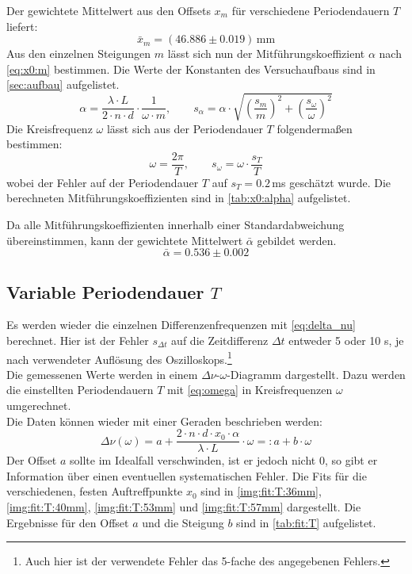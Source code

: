 Der gewichtete Mittelwert aus den Offsets $x_m$ für verschiedene Periodendauern $T$ liefert:
\begin{equation}
  \label{eq:xm}
  \bar{x}_{m} = (46.886 \pm 0.019)\,\text{mm}
\end{equation}
Aus den einzelnen Steigungen $m$ lässt sich nun der Mitführungskoeffizient $\alpha$ nach \autoref{eq:x0:m} bestimmen. Die Werte der Konstanten des 
Versuchaufbaus sind in \autoref{sec:aufbau} aufgelistet.
\begin{equation}
  \alpha = \frac{\lambda \cdot L}{2 \cdot n \cdot d} \cdot \frac{1}{\omega \cdot m}, \qquad
  s_{\alpha} = \alpha \cdot \sqrt{\left(\frac{s_m}{m}\right)^2 + \left(\frac{s_\omega}{\omega}\right)^2}
\end{equation}
Die Kreisfrequenz $\omega$ lässt sich aus der Periodendauer $T$ folgendermaßen bestimmen:
\begin{equation}
  \label{eq:omega}
  \omega = \frac{2 \pi}{T}, \qquad s_{\omega} = \omega \cdot \frac{s_T}{T}
\end{equation}
wobei der Fehler auf der Periodendauer $T$ auf $s_T = 0.2$\,ms geschätzt wurde.
Die berechneten Mitführungskoeffizienten sind in \autoref{tab:x0:alpha} aufgelistet.

Da alle Mitführungskoeffizienten innerhalb einer Standardabweichung übereinstimmen, kann der gewichtete Mittelwert $\bar{\alpha}$ gebildet werden.
\begin{equation}
  \label{eq:x0:alpha:avg}
  \bar{\alpha} = 0.536 \pm 0.002
\end{equation}

\subsection{Variable Periodendauer \texorpdfstring{$T$}{T}}
Es werden wieder die einzelnen Differenzenfrequenzen mit \autoref{eq:delta_nu} berechnet. Hier ist der Fehler $s_{\Delta t}$ 
auf die Zeitdifferenz $\Delta t$ entweder 5 oder 10 \textmu s, je nach verwendeter Auflösung des Oszilloskops.\footnote{Auch hier ist der 
verwendete Fehler das 5-fache des angegebenen Fehlers.} \\
Die gemessenen Werte werden in einem $\Delta \nu$-$\omega$-Diagramm dargestellt. 
Dazu werden die einstellten Periodendauern $T$ mit \autoref{eq:omega} in Kreisfrequenzen $\omega$ umgerechnet. \\
Die Daten können wieder mit einer Geraden beschrieben werden:
\begin{equation}
  \label{eq:nu_omega}
  \Delta \nu (\omega) = a + \frac{2 \cdot n \cdot d \cdot x_0 \cdot \alpha}{\lambda \cdot L} \cdot \omega  =: a + b \cdot \omega
\end{equation}
Der Offset $a$ sollte im Idealfall verschwinden, ist er jedoch nicht 0, so gibt er Information über einen eventuellen systematischen Fehler.
Die Fits für die verschiedenen, festen Auftreffpunkte $x_0$ sind in \autoref{img:fit:T:36mm}, \autoref{img:fit:T:40mm}, \autoref{img:fit:T:53mm} 
und \autoref{img:fit:T:57mm} dargestellt. Die Ergebnisse für den Offset $a$ und die Steigung $b$ sind in \autoref{tab:fit:T} aufgelistet.

